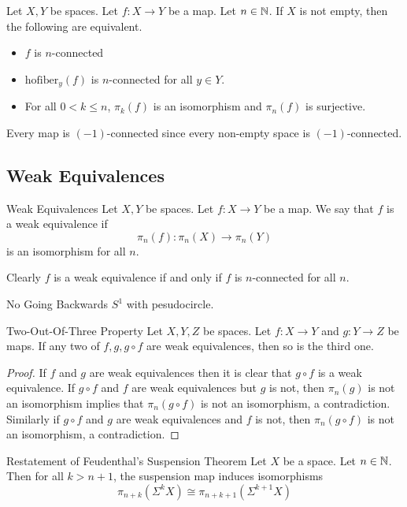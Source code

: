 \documentclass[a4paper]{article}
\begin{document}
\begin{prp}{}{} Let $X,Y$ be spaces. Let $f:X\to Y$ be a map. Let $n\in\mathbb{N}$. If $X$ is not empty, then the following are equivalent. 
\begin{itemize}
\item $f$ is $n$-connected
\item $\text{hofiber}_y(f)$ is $n$-connected for all $y\in Y$. 
\item For all $0<k\leq n$, $\pi_k(f)$ is an isomorphism and $\pi_n(f)$ is surjective. 
\end{itemize}
\end{prp}

Every map is $(-1)$-connected since every non-empty space is $(-1)$-connected. 

\subsection{Weak Equivalences}
\begin{defn}{Weak Equivalences}{} Let $X,Y$ be spaces. Let $f:X\to Y$ be a map. We say that $f$ is a weak equivalence if $$\pi_n(f):\pi_n(X)\to\pi_n(Y)$$ is an isomorphism for all $n$. 
\end{defn}

Clearly $f$ is a weak equivalence if and only if $f$ is $n$-connected for all $n$. 

\begin{eg}{No Going Backwards}{} $S^1$ with pesudocircle. 
\end{eg}

\begin{prp}{Two-Out-Of-Three Property}{} Let $X,Y,Z$ be spaces. Let $f:X\to Y$ and $g:Y\to Z$ be maps. If any two of $f,g,g\circ f$ are weak equivalences, then so is the third one. \tcbline
\begin{proof}
If $f$ and $g$ are weak equivalences then it is clear that $g\circ f$ is a weak equivalence. If $g\circ f$ and $f$ are weak equivalences but $g$ is not, then $\pi_n(g)$ is not an isomorphism implies that $\pi_n(g\circ f)$ is not an isomorphism, a contradiction. Similarly if $g\circ f$ and $g$ are weak equivalences and $f$ is not, then $\pi_n(g\circ f)$ is not an isomorphism, a contradiction. 
\end{proof}
\end{prp}

\begin{thm}{Restatement of Feudenthal's Suspension Theorem}{} Let $X$ be a space. Let $n\in\mathbb{N}$. Then for all $k>n+1$, the suspension map induces isomorphisms $$\pi_{n+k}(\Sigma^kX)\cong\pi_{n+k+1}(\Sigma^{k+1}X)$$
\end{thm}
\end{document}
